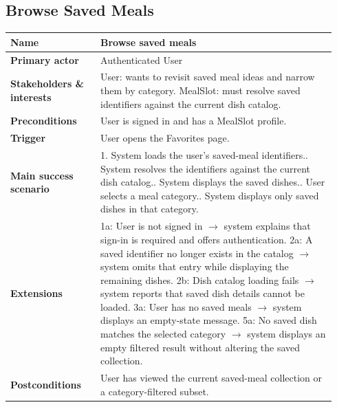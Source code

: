 \documentclass[sigconf]{acmart}
\begin{document}
\subsection*{Browse Saved Meals}
{\footnotesize
\begin{supertabular}{@{}p{0.26\linewidth}p{0.68\linewidth}@{}}
\textbf{Name} & Browse saved meals \\
\hline
\textbf{Primary actor} & Authenticated User \\
\hline
\textbf{Stakeholders \& interests} & User: wants to revisit saved meal ideas and narrow them by category. MealSlot: must resolve saved identifiers against the current dish catalog. \\
\hline
\textbf{Preconditions} & User is signed in and has a MealSlot profile. \\
\hline
\textbf{Trigger} & User opens the Favorites page. \\
\hline
\textbf{Main success scenario} & 1. System loads the user's saved-meal identifiers.. System resolves the identifiers against the current dish catalog.. System displays the saved dishes.. User selects a meal category.. System displays only saved dishes in that category. \\
\hline
\textbf{Extensions} & 1a: User is not signed in $\rightarrow$ system explains that sign-in is required and offers authentication.\newline
2a: A saved identifier no longer exists in the catalog $\rightarrow$ system omits that entry while displaying the remaining dishes.\newline
2b: Dish catalog loading fails $\rightarrow$ system reports that saved dish details cannot be loaded.\newline
3a: User has no saved meals $\rightarrow$ system displays an empty-state message.\newline
5a: No saved dish matches the selected category $\rightarrow$ system displays an empty filtered result without altering the saved collection. \\
\hline
\textbf{Postconditions} & User has viewed the current saved-meal collection or a category-filtered subset. \\
\end{supertabular}
}
\end{document}
